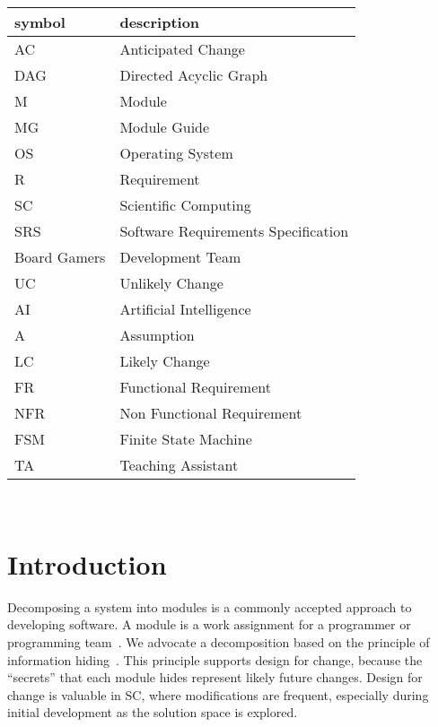 \documentclass[12pt, titlepage]{article}
\begin{document}
\renewcommand{\arraystretch}{1.2}
\begin{tabular}{l l} 
  \toprule		
  \textbf{symbol} & \textbf{description}\\
  \midrule 
  AC & Anticipated Change\\
  DAG & Directed Acyclic Graph \\
  M & Module \\
  MG & Module Guide \\
  OS & Operating System \\
  R & Requirement\\
  SC & Scientific Computing \\
  SRS & Software Requirements Specification\\
  Board Gamers & Development Team\\
  UC & Unlikely Change \\
  AI & Artificial Intelligence \\
  A & Assumption \\
  LC & Likely Change\\
  FR & Functional Requirement \\
  NFR & Non Functional Requirement \\
  FSM & Finite State Machine \\ 
  TA & Teaching Assistant \\
  \bottomrule
\end{tabular}\\



\newpage

\tableofcontents

\listoftables

\listoffigures

\newpage


\section{Introduction}

Decomposing a system into modules is a commonly accepted approach to developing
software.  A module is a work assignment for a programmer or programming
team~\citep{ParnasEtAl1984}.  We advocate a decomposition
based on the principle of information hiding~\citep{Parnas1972a}.  This
principle supports design for change, because the ``secrets'' that each module
hides represent likely future changes.  Design for change is valuable in SC,
where modifications are frequent, especially during initial development as the
solution space is explored.  
\end{document}
